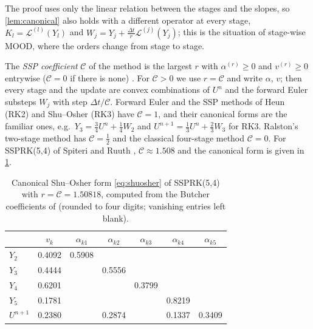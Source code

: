 \documentclass[11pt,a4paper]{article}
\theoremstyle{plain}
\theoremstyle{definition}
\theoremstyle{remark}
\numberwithin{equation}{section}
\newcommand{\Lop}{\mathcal{L}}
\newcommand{\Csp}{\mathcal{C}}
\begin{document}
The proof uses only the linear relation between the stages and the slopes, so \cref{lem:canonical} also holds with a different operator at every stage, $K_l=\Lop^{(l)}(Y_l)$ and $W_j=Y_j+\tfrac{\Delta t}{r}\Lop^{(j)}(Y_j)$; this is the situation of stage-wise MOOD, where the orders change from stage to stage.

The \emph{SSP coefficient} $\Csp$ of the method is the largest $r$ with $\alpha^{(r)}\ge0$ and $v^{(r)}\ge0$ entrywise ($\Csp=0$ if there is none) \cite{Ketcheson2008,GottliebKetchesonShu2011}. For $\Csp>0$ we use $r=\Csp$ and write $\alpha$, $v$; then every stage and the update are convex combinations of $U^n$ and the forward Euler substeps $W_j$ with step $\Delta t/\Csp$. Forward Euler and the SSP methods of Heun (RK2) and Shu--Osher (RK3) \cite{ShuOsher1988,Gottlieb2001} have $\Csp=1$, and their canonical forms are the familiar ones, e.g.\ $Y_3=\tfrac34U^n+\tfrac14W_2$ and $U^{n+1}=\tfrac13U^n+\tfrac23W_3$ for RK3. Ralston's two-stage method has $\Csp=\tfrac12$ and the classical four-stage method $\Csp=0$. For SSPRK(5,4) of Spiteri and Ruuth \cite{SpiteriRuuth2002}, $\Csp\approx1.508$ and the canonical form is given in \cref{tab:ssprk54}.

\begin{table}[t]
\centering
\caption{Canonical Shu--Osher form \eqref{eq:shuosher} of SSPRK(5,4) with $r=\Csp=1.50818$, computed from the Butcher coefficients of \cite{SpiteriRuuth2002} (rounded to four digits; vanishing entries left blank).}\label{tab:ssprk54}
\small
\begin{tabular}{lcccccc}
\toprule
& $v_k$ & $\alpha_{k1}$ & $\alpha_{k2}$ & $\alpha_{k3}$ & $\alpha_{k4}$ & $\alpha_{k5}$\\
\midrule
$Y_2$ & 0.4092 & 0.5908 & & & & \\
$Y_3$ & 0.4444 & & 0.5556 & & & \\
$Y_4$ & 0.6201 & & & 0.3799 & & \\
$Y_5$ & 0.1781 & & & & 0.8219 & \\
$U^{n+1}$ & 0.2380 & & 0.2874 & & 0.1337 & 0.3409\\
\bottomrule
\end{tabular}
\end{table}
\end{document}
